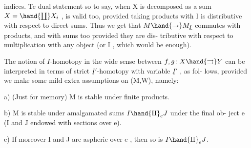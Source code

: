indices.  Te dual statement so to say,  when X is decomposed as a sum
$X = \hand{\coprod} X_i$ ,  is valid too,  provided taking products with I is distributive
with respect to  direct sums.  Thus we get that $M \hand{\to} M_{\underline{I}}$  commutes with %
  \xout{\illegible{}} products,  and with   sums too provided they are dis-%
tributive with respect to multiplication with any object  (or  I ,
which would be enough).

The notion of $\underline{I}$-homotopy in the wide sense between $f,g\colon X \hand{\rightrightarrows} Y$ can
be interpreted in terms of strict $\underline{I}'$-homotopy with variable $\underline{I}'$ ,  as fol-%
lows,  provided we make some mild extra assumptions on (M,W), namely:

a)  (Just for memory)  M is stable under finite products.

b)  M is stable under amalgamated sums  $I \hand{\amalg}_e J$  under the final ob-%
ject e (I and J endowed with sections over e).

c)  If moreover I and J are aspheric over e ,  then so is $I \hand{\amalg}_e J$.

